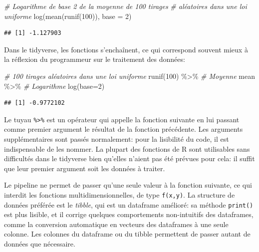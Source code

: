 \documentclass[
  11pt,
  french,
  a4paper,
  extrafontsizes,onecolumn,openright
  ]{memoir}
\newenvironment{Shaded}{\begin{snugshade}}{\end{snugshade}}
\newcommand{\AttributeTok}[1]{\textcolor[rgb]{0.77,0.63,0.00}{#1}}
\newcommand{\CommentTok}[1]{\textcolor[rgb]{0.56,0.35,0.01}{\textit{#1}}}
\newcommand{\DecValTok}[1]{\textcolor[rgb]{0.00,0.00,0.81}{#1}}
\newcommand{\FunctionTok}[1]{\textcolor[rgb]{0.00,0.00,0.00}{#1}}
\newcommand{\NormalTok}[1]{#1}
\newcommand{\SpecialCharTok}[1]{\textcolor[rgb]{0.00,0.00,0.00}{#1}}
\begin{document}
\begin{Shaded}
\begin{Highlighting}[]
\CommentTok{\# Logarithme de base 2 de la moyenne de 100 tirages}
\CommentTok{\# aléatoires dans une loi uniforme}
\FunctionTok{log}\NormalTok{(}\FunctionTok{mean}\NormalTok{(}\FunctionTok{runif}\NormalTok{(}\DecValTok{100}\NormalTok{)), }\AttributeTok{base =} \DecValTok{2}\NormalTok{)}
\end{Highlighting}
\end{Shaded}

\begin{verbatim}
## [1] -1.127903
\end{verbatim}

\normalsize

Dans le tidyverse, les fonctions s'enchaînent, ce qui correspond souvent mieux à la réflexion du programmeur sur le traitement des données:

\scriptsize

\begin{Shaded}
\begin{Highlighting}[]
\CommentTok{\# 100 tirages aléatoires dans une loi uniforme}
\FunctionTok{runif}\NormalTok{(}\DecValTok{100}\NormalTok{) }\SpecialCharTok{\%\textgreater{}\%} 
  \CommentTok{\# Moyenne}
\NormalTok{  mean }\SpecialCharTok{\%\textgreater{}\%} 
  \CommentTok{\# Logarithme}
  \FunctionTok{log}\NormalTok{(}\AttributeTok{base=}\DecValTok{2}\NormalTok{)}
\end{Highlighting}
\end{Shaded}

\begin{verbatim}
## [1] -0.9772102
\end{verbatim}

\normalsize

Le tuyau \texttt{\%\textgreater{}\%} est un opérateur qui appelle la fonction suivante en lui passant comme premier argument le résultat de la fonction précédente.
Les arguments supplémentaires sont passés normalement: pour la lisibilité du code, il est indispensable de les nommer.
La plupart des fonctions de R sont utilisables sans difficultés dans le tidyverse bien qu'elles n'aient pas été prévues pour cela: il suffit que leur premier argument soit les données à traiter.

Le pipeline ne permet de passer qu'une seule valeur à la fonction suivante, ce qui interdit les fonctions multidimensionnelles, de type \texttt{f(x,y)}.
La structure de données préférée est le \emph{tibble}, qui est un dataframe amélioré: sa méthode \texttt{print()} est plus lisible, et il corrige quelques comportements non-intuitifs des dataframes, comme la conversion automatique en vecteurs des dataframes à une seule colonne.
Les colonnes du dataframe ou du tibble permettent de passer autant de données que nécessaire.
\end{document}
